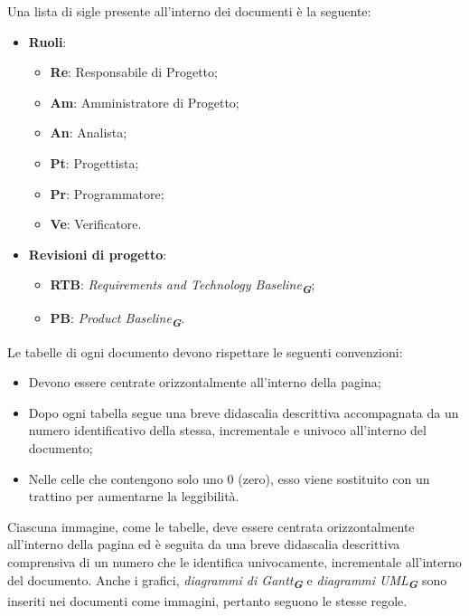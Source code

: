 Una lista di sigle presente all'interno dei documenti è la seguente:
\begin{itemize}
    \item \textbf{Ruoli}:
    \begin{itemize}
        \item \textbf{Re}: Responsabile di Progetto;
        \item \textbf{Am}: Amministratore di Progetto;
        \item \textbf{An}: Analista;
        \item \textbf{Pt}: Progettista;
        \item \textbf{Pr}: Programmatore;
        \item \textbf{Ve}: Verificatore.
    \end{itemize}
    \item \textbf{Revisioni di progetto}:
    \begin{itemize}
        \item \textbf{RTB}: \emph{Requirements and Technology Baseline}\textsubscript{\textit{\textbf{G}}};
        \item \textbf{PB}: \emph{Product Baseline}\textsubscript{\textit{\textbf{G}}}.
    \end{itemize}
\end{itemize}

Le tabelle di ogni documento devono rispettare le seguenti convenzioni:
\begin{itemize}
    \item Devono essere centrate orizzontalmente all’interno della pagina;
    \item Dopo ogni tabella segue una breve didascalia descrittiva accompagnata da un numero
    identificativo della stessa, incrementale e univoco all’interno del documento;
    \item Nelle celle che contengono solo uno 0 (zero), esso viene sostituito con un trattino per
    aumentarne la leggibilità.
\end{itemize}

Ciascuna immagine, come le tabelle, deve essere centrata orizzontalmente all’interno della
pagina ed è seguita da una breve didascalia descrittiva comprensiva di un numero che le
identifica univocamente, incrementale all’interno del documento. Anche i grafici, 
\emph{diagrammi di Gantt}\textsubscript{\textit{\textbf{G}}} e \emph{diagrammi UML}\textsubscript{\textit{\textbf{G}}} 
sono inseriti nei documenti come immagini, pertanto seguono le stesse regole.


